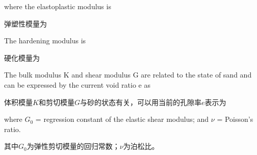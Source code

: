 \begin{ParaColumn}
    \noindent
    where the elastoplastic modulus is

    \switchcolumn

    \noindent
    弹塑性模量为

    \switchcolumn*

    \noindent
    The hardening modulus is

    \switchcolumn

    \noindent
    硬化模量为

    \switchcolumn*

    The bulk modulus K and shear modulus G are related to the state of sand and can be expressed by the current void ratio e as \citep{ERichart1970}

    \switchcolumn

    体积模量$K$和剪切模量$G$与砂的状态有关，可以用当前的孔隙率$e$表示为\citep{ERichart1970}

    \switchcolumn*

    \noindent
    where $G_0$ = regression constant of the elastic shear modulus; and $\nu$ = Poisson’s ratio.

    \switchcolumn

    \noindent
    其中$G_0$为弹性剪切模量的回归常数；$\nu$为泊松比。
\end{ParaColumn}